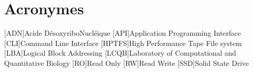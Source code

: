 
\chapter*{Acronymes}
\begin{acronym}
	[ADN]{Acide DésoxyriboNucléique}
	[API]{Application Programming Interface}
	[CLI]{Command Line Interface}
	[HPTFS]{High Performance Tape File system}
	[LBA]{Logical Block Addressing}
	[LCQB]{Laboratory of Computational and Quantitative Biology}
	[RO]{Read Only}
	[RW]{Read Write}
	[SSD]{Solid State Drive}
\end{acronym}
